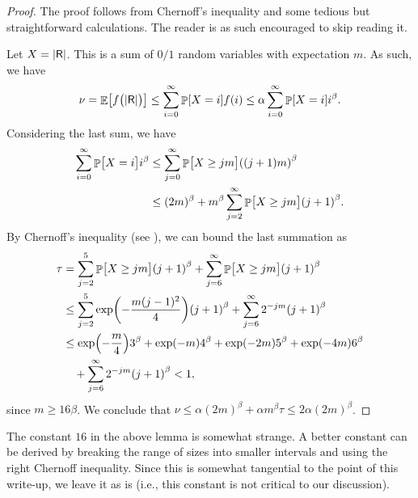 \begin{proof}
    The proof follows from Chernoff's inequality and some tedious but
    straightforward calculations. The reader is as such encouraged to
    skip reading it.

    Let $X = \left| {\mathsf{R}} \right|$. This is a sum of $0/1$ random variables with
    expectation $m$. As such, we have
    \begin{equation*}
        \nu%
        =%
        \Ex{\bigl. \cFuncX{\bigl.\cardin{\Sample}} }%
        \leq %
        \sum_{i=0}^\infty \Prob{X = i} f(i)
        \leq%
        \alpha 
        \sum_{i=0}^\infty \Prob{X = i} 
        i^\beta.        
    \end{equation*}
    Considering the last sum, we have
    \begin{align*}
        \sum_{i=0}^\infty \Prob{\big. X = i} i^\beta
        &\leq %
        \sum_{j=0}^\infty \Prob{\big. X \geq  j  m } \pth{(j+1) m}^\beta%
        \\&
        \leq %
        (2m)^\beta
        + m^\beta \sum_{j=2}^\infty \Prob{\big. X \geq  j  m }
        \pth{j+1 }^\beta.%
    \end{align*}
    By Chernoff's inequality (see ), we
    can bound the last summation as
    \begin{align*}
      \tau%
      &= %
        \sum_{j=2}^5 \Prob{\big. X \geq  j  m }
        \pth{j+1 }^\beta
        + 
        \sum_{j=6}^\infty \Prob{\big. X \geq  j  m }
        \pth{j+1 }^\beta
      \\&%
      \leq      
      \sum_{j=2}^5 \exp \pth{ - \frac{m (j-1)^2}{4} }
      \pth{j+1 }^\beta
      + 
      \sum_{j=6}^\infty 2^{-jm}
      \pth{j+1 }^\beta %
      \\&%
      \leq%
      \exp\pth{ - \frac{m}{4} } 3^\beta
      + \exp\pth{ - m} 4^\beta
      + \exp\pth{ - 2m} 5^\beta
      + \exp\pth{ - 4m} 6^\beta
      \\&\quad
      + \sum_{j=6}^\infty 2^{-jm}
      \pth{j+1 }^\beta %
      < 1,
    \end{align*}
    since $m \geq 16 \beta$. We conclude that
    $\nu \leq \alpha (2 m)^\beta + \alpha m^\beta \tau \leq 2
    \alpha(2m)^\beta$.
\end{proof}

\begin{remark}
    The constant $16$ in the above lemma is somewhat strange. A better
    constant can be derived by breaking the range of sizes into
    smaller intervals and using the right Chernoff inequality. Since
    this is somewhat tangential to the point of this write-up, we
    leave it as is (i.e., this constant is not critical to our
    discussion).
\end{remark}



